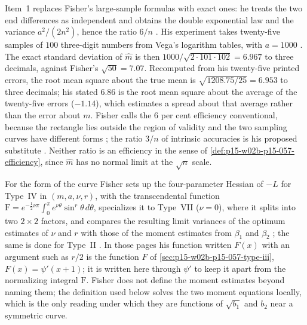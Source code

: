Item~1 replaces Fisher's large-sample formulas with exact ones: he treats
the two end differences as independent and obtains the double exponential
law and the variance \(a^2/(2n^2)\), hence the ratio \(6/n\)
\cite[pp.~348--349]{Fisher1922Foundations}. His experiment takes
twenty-five samples of \(100\) three-digit numbers from Vega's logarithm
tables, with \(a=1000\) \cite[p.~350]{Fisher1922Foundations}. The exact
standard deviation of \(\hat m\) is then
\(1000/\sqrt{2\cdot101\cdot102}=6.967\) to three decimals, against
Fisher's \(\sqrt{50}=7.07\). Recomputed from his twenty-five printed errors,
the root mean square about the true mean is \(\sqrt{1208.75/25}=6.953\) to
three decimals; his stated \(6.86\) is the root mean square about the
average of the twenty-five errors (\(-1.14\)), which estimates a spread
about that average rather than the error about \(m\). Fisher calls the
6 per cent efficiency conventional, because the rectangle lies outside
the region of validity and the two sampling curves have different forms
\cite[p.~350]{Fisher1922Foundations}; the ratio \(3/n\) of intrinsic
accuracies is his proposed substitute \cite[p.~351]{Fisher1922Foundations}.
Neither ratio is an efficiency in the sense of
\cref{def:p15-w02b-p15-057-efficiency}, since \(\hat m\) has no normal
limit at the \(\sqrt n\) scale.

For the form of the curve Fisher sets up the four-parameter Hessian of
\(-L\) for Type~IV in \((m,a,\nu,r)\), with the transcendental function
\(\mathrm F=e^{-\frac12\nu\pi}\int_0^\pi e^{\nu\theta}\sin^r\theta\,d\theta\),
specializes it to Type~VII (\(\nu=0\)), where it splits into two
\(2\times2\) factors, and compares the resulting limit variances of the
optimum estimates of \(\nu\) and \(r\) with those of the moment estimates
from \(\beta_1\) and \(\beta_2\) \cite[pp.~351--353]{Fisher1922Foundations};
the same is done for Type~II \cite[pp.~354--355]{Fisher1922Foundations}.
In those pages his function written \(F(x)\) with an argument such as
\(r/2\) is the function \(F\) of \cref{sec:p15-w02b-p15-057-type-iii},
\(F(x)=\psi'(x+1)\); it is written here through \(\psi'\) to keep it apart
from the normalizing integral \(\mathrm F\). Fisher does not define the
moment estimates beyond naming them; the definition used below solves the
two moment equations locally, which is the only reading under which they
are functions of \(\sqrt{b_1}\) and \(b_2\) near a symmetric curve.

